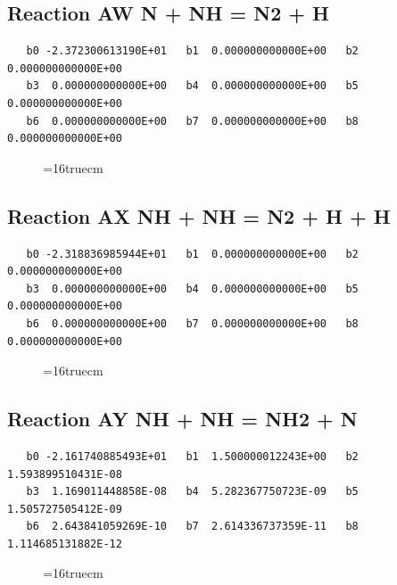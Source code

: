 \documentclass[12pt,dvipdfm]{article}
\begin{document}
\subsection{
Reaction AW N + NH = N2 + H }
\begin{small}\begin{verbatim}
   b0 -2.372300613190E+01   b1  0.000000000000E+00   b2  0.000000000000E+00
   b3  0.000000000000E+00   b4  0.000000000000E+00   b5  0.000000000000E+00
   b6  0.000000000000E+00   b7  0.000000000000E+00   b8  0.000000000000E+00
\end{verbatim}\end{small}
\begin{figure}[h!] \label{n2rates}
\epsfxsize=16truecm
\end{figure}
\newpage

\subsection{
Reaction AX NH + NH = N2 + H + H }
\begin{small}\begin{verbatim}
   b0 -2.318836985944E+01   b1  0.000000000000E+00   b2  0.000000000000E+00
   b3  0.000000000000E+00   b4  0.000000000000E+00   b5  0.000000000000E+00
   b6  0.000000000000E+00   b7  0.000000000000E+00   b8  0.000000000000E+00
\end{verbatim}\end{small}
\begin{figure}[h!] \label{n2rates}
\epsfxsize=16truecm
\end{figure}
\newpage

\subsection{
Reaction AY NH + NH = NH2 + N }
\begin{small}\begin{verbatim}
   b0 -2.161740885493E+01   b1  1.500000012243E+00   b2  1.593899510431E-08
   b3  1.169011448858E-08   b4  5.282367750723E-09   b5  1.505727505412E-09
   b6  2.643841059269E-10   b7  2.614336737359E-11   b8  1.114685131882E-12
\end{verbatim}\end{small}
\begin{figure}[h!] \label{n2rates}
\epsfxsize=16truecm
\end{figure}
\newpage
\end{document}
